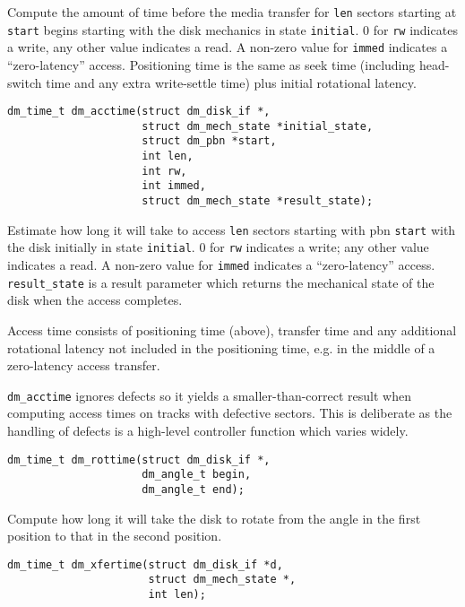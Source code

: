 Compute the amount of time before the media transfer for \texttt{len}
sectors starting at \texttt{start} begins starting with the disk
mechanics in state \texttt{initial}.  0 for \texttt{rw} indicates a
write, any other value indicates a read.  A non-zero value for
\texttt{immed} indicates a ``zero-latency'' access.  Positioning time
is the same as seek time (including head-switch time and any extra
write-settle time) plus initial rotational latency.

\begin{verbatim}
dm_time_t dm_acctime(struct dm_disk_if *, 
                     struct dm_mech_state *initial_state,
                     struct dm_pbn *start,
                     int len,
                     int rw,
                     int immed,
                     struct dm_mech_state *result_state);
\end{verbatim}

Estimate how long it will take to access \texttt{len} sectors starting
with pbn \texttt{start} with the disk initially in state
\texttt{initial}. 0 for \texttt{rw} indicates a write; any other value
indicates a read.  A non-zero value for \texttt{immed} indicates a
``zero-latency'' access.  \texttt{result\_state} is a result parameter
which returns the mechanical state of the disk when the access
completes.

Access time consists of positioning time (above), transfer time and
any additional rotational latency not included in the positioning
time, e.g. in the middle of a zero-latency access transfer. 

\texttt{dm\_acctime} ignores defects so it yields a smaller-than-correct 
result when computing access times on tracks with defective sectors.
This is deliberate as the handling of defects is a high-level
controller function which varies widely.

\begin{verbatim}
dm_time_t dm_rottime(struct dm_disk_if *,
                     dm_angle_t begin,
                     dm_angle_t end);
\end{verbatim}

Compute how long it will take the disk to rotate from the angle in the
first position to that in the second position.
  

\begin{verbatim}
dm_time_t dm_xfertime(struct dm_disk_if *d,
                      struct dm_mech_state *,
                      int len);
\end{verbatim}

